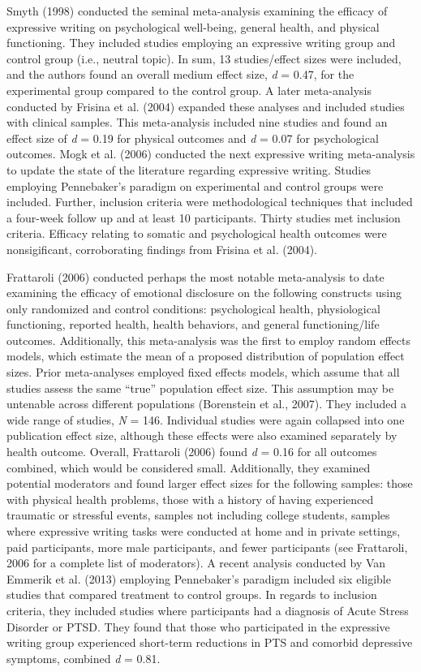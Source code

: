 \documentclass[man]{apa6}
\newcounter{author}
\theoremstyle{definition}
\theoremstyle{definition}
\theoremstyle{definition}
\theoremstyle{remark}
\begin{document}
Smyth (1998) conducted the seminal meta-analysis examining the efficacy
of expressive writing on psychological well-being, general health, and
physical functioning. They included studies employing an expressive
writing group and control group (i.e., neutral topic). In sum, 13
studies/effect sizes were included, and the authors found an overall
medium effect size, \emph{d} = 0.47, for the experimental group compared
to the control group. A later meta-analysis conducted by Frisina et al.
(2004) expanded these analyses and included studies with clinical
samples. This meta-analysis included nine studies and found an effect
size of \emph{d} = 0.19 for physical outcomes and \emph{d} = 0.07 for
psychological outcomes. Mogk et al. (2006) conducted the next expressive
writing meta-analysis to update the state of the literature regarding
expressive writing. Studies employing Pennebaker's paradigm on
experimental and control groups were included. Further, inclusion
criteria were methodological techniques that included a four-week follow
up and at least 10 participants. Thirty studies met inclusion criteria.
Efficacy relating to somatic and psychological health outcomes were
nonsigificant, corroborating findings from Frisina et al. (2004).

Frattaroli (2006) conducted perhaps the most notable meta-analysis to
date examining the efficacy of emotional disclosure on the following
constructs using only randomized and control conditions: psychological
health, physiological functioning, reported health, health behaviors,
and general functioning/life outcomes. Additionally, this meta-analysis
was the first to employ random effects models, which estimate the mean
of a proposed distribution of population effect sizes. Prior
meta-analyses employed fixed effects models, which assume that all
studies assess the same \enquote{true} population effect size. This
assumption may be untenable across different populations (Borenstein et
al., 2007). They included a wide range of studies, \emph{N} = 146.
Individual studies were again collapsed into one publication effect
size, although these effects were also examined separately by health
outcome. Overall, Frattaroli (2006) found \emph{d} = 0.16 for all
outcomes combined, which would be considered small. Additionally, they
examined potential moderators and found larger effect sizes for the
following samples: those with physical health problems, those with a
history of having experienced traumatic or stressful events, samples not
including college students, samples where expressive writing tasks were
conducted at home and in private settings, paid participants, more male
participants, and fewer participants (see Frattaroli, 2006 for a
complete list of moderators). A recent analysis conducted by Van Emmerik
et al. (2013) employing Pennebaker's paradigm included six eligible
studies that compared treatment to control groups. In regards to
inclusion criteria, they included studies where participants had a
diagnosis of Acute Stress Disorder or PTSD. They found that those who
participated in the expressive writing group experienced short-term
reductions in PTS and comorbid depressive symptoms, combined \emph{d} =
0.81.
\end{document}
